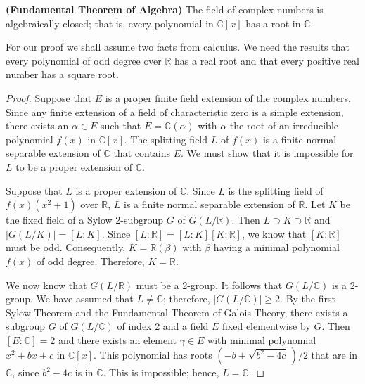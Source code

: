  
\begin{theorem} {\bf (Fundamental Theorem of Algebra)}
The field of complex numbers is algebraically closed; that is, every
polynomial in ${\mathbb C}[x]$ has a root in ${\mathbb C}$. 
\end{theorem}
 
 
For our proof we shall assume two facts from calculus.  We need the
results that every polynomial of odd degree over ${\mathbb R}$ has a real
root and that every positive real number has a square root.  
 
 
\medskip
 
 
\begin{proof}
Suppose that $E$ is a proper finite field extension of the complex 
numbers. Since any finite extension of a field of characteristic zero
is a simple extension, there exists an $\alpha \in E$ such that $E =
{\mathbb C}( \alpha )$ with $\alpha$ the root of an irreducible
polynomial $f(x)$ in ${\mathbb C}[x]$. The splitting field $L$ of $f(x)$ 
is a finite normal separable extension of ${\mathbb C}$ that contains  $E$.
We must show that it is impossible for $L$ to be a proper extension of
${\mathbb C}$. 
 
 
Suppose that $L$ is a proper extension of ${\mathbb C}$. Since $L$ is the
splitting field of $f(x)(x^2 + 1)$ over ${\mathbb R}$, $L$ is a finite
normal separable extension of ${\mathbb R}$. Let $K$ be the fixed field
of a Sylow 2-subgroup $G$ of $G(L/{\mathbb R})$. Then $L \supset  K
\supset {\mathbb R}$ and $|G( L / K )| =[L:K]$. Since $[L : {\mathbb R}] =
[L:K][K:{\mathbb R}]$, we know that $[K:{\mathbb R}]$ must be odd.
Consequently, $K = {\mathbb R}(\beta)$ with $\beta$ having a minimal
polynomial $f(x)$ of odd degree.  Therefore, $K = {\mathbb R}$. 
 
 
We now know that $G(L/{\mathbb R})$ must be a 2-group. It follows that
$G(L / {\mathbb C})$ is a 2-group.  We have assumed that $L \neq {\mathbb
C}$; therefore, $|G(L / {\mathbb C})| \geq 2$.  By the first Sylow
Theorem and the Fundamental Theorem of Galois Theory, there exists a
subgroup $G$ of $G(L/{\mathbb C})$ of index 2 and a field $E$ fixed
elementwise by $G$. Then $[E:{\mathbb C}] = 2$ and there exists an
element $\gamma \in E$ with minimal polynomial $x^2 + b x + c$ in
${\mathbb C}[x]$.  This polynomial has roots $( - b \pm \sqrt{b^2 - 4
c}\, ) / 2$ that are in ${\mathbb C}$, since $b^2 - 4 c$ is in ${\mathbb
C}$.  This is impossible; hence, $L = {\mathbb C}$.
\end{proof}
 
